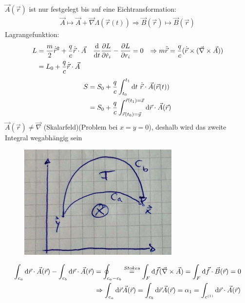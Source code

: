 $\vec{A}(\vec{r})$ ist nur festgelegt bis auf eine Eichtransformation:
	\begin{align*}
		\vec{A} \mapsto \vec{A} + \vec{\nabla} \Lambda (\vec{r}(t)) 
		\Rightarrow \vec{B}(\vec{r}) \mapsto \vec{B}(\vec{r})
	\end{align*}
Lagrangefunktion:
	\begin{align*}
		L &= \frac{m}{2} \dot{\vec{r}}^2 + \frac{q}{c} \dot{\vec{r}} \cdot \vec{A}
		& \frac{\mathrm{d}}{\mathrm{d} t} \frac{\partial L}{\partial \dot{r}_i} - \frac{\partial L}{\partial r_i} &= 0 &
		\Rightarrow m \ddot{\vec{r}} &= \frac{q}{c} (\dot{\vec{r}} \times(\vec{\nabla} \times \vec{A})) \\
		&= L_0 + \frac{q}{c} \dot{\vec{r}} \cdot \vec{A}
	\end{align*}
	\begin{align*}
		S &= S_0 + \frac{q}{c} \int_{t_0}^{t_1} \mathrm{d} t ~\dot{\vec{r}} \cdot \vec{A}(\vec{r}(t)) \\
		&= S_0 + \frac{q}{c} \int_{\vec{r}(t_0) = \vec{y}}^{\vec{r}(t_1) = \vec{x}} \mathrm{d} \vec{r} \cdot \vec{A}(\vec{r}) 
	\end{align*}
$\vec{A}(\vec{r}) \neq \vec{\nabla}$ (Skalarfeld)(Problem bei $x=y=0$), deshalb wird das zweite Integral wegabhängig sein
	\begin{figure} [h]
		\begin{center}
			\includegraphics[width=8cm]{Aharanov-Bohn-Effekt2}
		\end{center}
	\end{figure}
\FloatBarrier
	\begin{align*}
		\int_{c_a} \mathrm{d} \vec{r} \cdot \vec{A}(\vec{r}) - \int_{c_b} \mathrm{d} \vec{r} \cdot \vec{A}(\vec{r}) &=
		\oint_{c_a-c_b} \overset{Stokes}{=} 
		\int_F \mathrm{d} \vec{f} (\vec{\nabla} \times \vec{A}) = \int_F \mathrm{d} \vec{f} \cdot \vec{B}(\vec{r}) =0 \\
		&\Rightarrow 
		\int_{c_a} \mathrm{d} \vec{r} \vec{A}(\vec{r}) = \int_{c_b} \mathrm{d} \vec{r} \vec{A}(\vec{r}) =
		\alpha_1 = \int_{c^{(1)}} \mathrm{d} \vec{r} \cdot \vec{A}(\vec{r})
	\end{align*}

